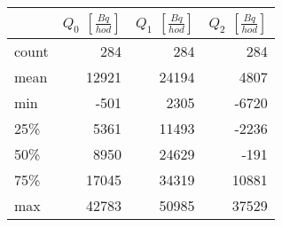 \begin{tabular}{lrrr}
\toprule
{} &  $Q_0$ $\left[\si{\frac{Bq}{hod}}\right]$ &  $Q_1$ $\left[\si{\frac{Bq}{hod}}\right]$ &  $Q_2$ $\left[\si{\frac{Bq}{hod}}\right]$ \\
\midrule
count &                                       284 &                                       284 &                                       284 \\
mean  &                                     12921 &                                     24194 &                                      4807 \\
min   &                                      -501 &                                      2305 &                                     -6720 \\
25\%   &                                      5361 &                                     11493 &                                     -2236 \\
50\%   &                                      8950 &                                     24629 &                                      -191 \\
75\%   &                                     17045 &                                     34319 &                                     10881 \\
max   &                                     42783 &                                     50985 &                                     37529 \\
\bottomrule
\end{tabular}
